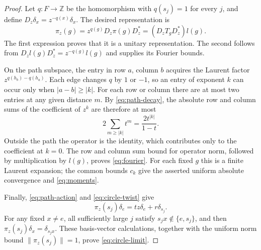 \begin{proof}
Let $q:F\to\mathbb Z$ be the homomorphism with $q(s_j)=1$ for every
$j$, and define $D_z\delta_x=z^{-q(x)}\delta_x$. The desired
representation is
\begin{equation}\label{eq:circle-twist}
 \pi_z(g)=z^{q(g)}D_z\pi(g)D_z^*
          =(D_zT_gD_z^*)l(g).
\end{equation}
The first expression proves that it is a unitary representation. The
second follows from $D_zl(g)D_z^*=z^{-q(g)}l(g)$ and supplies its
Fourier bounds.

On the path subspace, the entry in row $a$, column $b$ acquires the
Laurent factor $z^{q(h_b)-q(h_a)}$. Each edge changes $q$ by $1$ or
$-1$, so an entry of exponent $k$ can occur only when $|a-b|\geq|k|$.
For each row or column there are at most two entries at any given
distance $m$. By \eqref{eq:path-decay}, the absolute row and column
sums of the coefficient of $z^k$ are therefore at most
\[
 2\sum_{m\geq|k|}t^m=\frac{2t^{|k|}}{1-t}.
\]
Outside the path the operator is the identity, which contributes only
to the coefficient at $k=0$. The row and column sum bound for operator
norm, followed by multiplication by $l(g)$, proves
\eqref{eq:fourier}. For each fixed $g$ this is a finite Laurent
expansion; the common bounds $c_k$ give the asserted uniform absolute
convergence and \eqref{eq:moments}.

Finally, \eqref{eq:path-action} and \eqref{eq:circle-twist} give
\[
 \pi_z(s_j)\delta_e=tz\delta_e+r\delta_{s_j}.
\]
For any fixed $x\ne e$, all sufficiently large $j$ satisfy
$s_jx\notin\{e,s_j\}$, and then
$\pi_z(s_j)\delta_x=\delta_{s_jx}$. These basis-vector calculations,
together with the uniform norm bound $\|\pi_z(s_j)\|=1$, prove
\eqref{eq:circle-limit}.
\end{proof}
